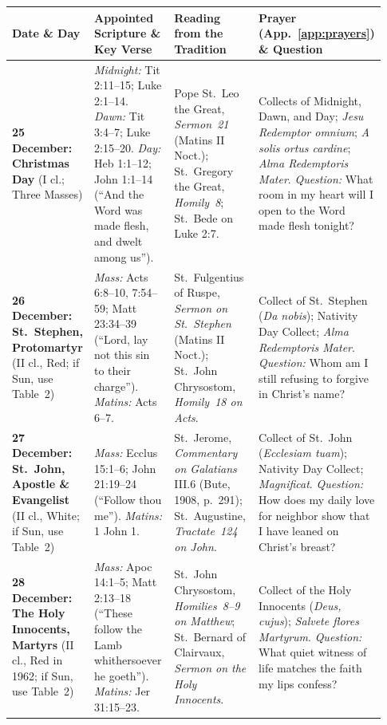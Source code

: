 {\footnotesize
\begin{longtable}{>{\raggedright\arraybackslash}p{0.15\linewidth}>{\raggedright\arraybackslash}p{0.25\linewidth}>{\raggedright\arraybackslash}p{0.27\linewidth}>{\raggedright\arraybackslash}p{0.26\linewidth}}
\toprule
\textbf{Date \& Day} & \textbf{Appointed Scripture \& Key Verse} & \textbf{Reading from the Tradition} & \textbf{Prayer (App.~\ref{app:prayers}) \& Question}\\
\midrule
\endhead
\textbf{25 December: Christmas Day} (I cl.; Three Masses) & \textit{Midnight:} Tit 2:11--15; Luke 2:1--14. \textit{Dawn:} Tit 3:4--7; Luke 2:15--20. \textit{Day:} Heb 1:1--12; John 1:1--14 (``And the Word was made flesh, and dwelt among us''). & Pope St.~Leo the Great, \textit{Sermon~21} (Matins II Noct.); St.~Gregory the Great, \textit{Homily~8}; St.~Bede on Luke 2:7. & Collects of Midnight, Dawn, and Day; \textit{Jesu Redemptor omnium}; \textit{A solis ortus cardine}; \textit{Alma Redemptoris Mater}. \textit{Question:} What room in my heart will I open to the Word made flesh tonight?\\
\textbf{26 December: St.~Stephen, Protomartyr} (II cl., Red; if Sun, use Table~2) & \textit{Mass:} Acts 6:8--10, 7:54--59; Matt 23:34--39 (``Lord, lay not this sin to their charge''). \textit{Matins:} Acts 6--7. & St.~Fulgentius of Ruspe, \textit{Sermon on St.~Stephen} (Matins II Noct.); St.~John Chrysostom, \textit{Homily~18 on Acts}. & Collect of St.~Stephen (\textit{Da nobis}); Nativity Day Collect; \textit{Alma Redemptoris Mater}. \textit{Question:} Whom am I still refusing to forgive in Christ's name?\\
\textbf{27 December: St.~John, Apostle \& Evangelist} (II cl., White; if Sun, use Table~2) & \textit{Mass:} Ecclus 15:1--6; John 21:19--24 (``Follow thou me''). \textit{Matins:} 1 John 1. & St.~Jerome, \textit{Commentary on Galatians} III.6 (Bute, 1908, p.~291); St.~Augustine, \textit{Tractate~124 on John}. & Collect of St.~John (\textit{Ecclesiam tuam}); Nativity Day Collect; \textit{Magnificat}. \textit{Question:} How does my daily love for neighbor show that I have leaned on Christ's breast?\\
\textbf{28 December: The Holy Innocents, Martyrs} (II cl., Red in 1962; if Sun, use Table~2) & \textit{Mass:} Apoc 14:1--5; Matt 2:13--18 (``These follow the Lamb whithersoever he goeth''). \textit{Matins:} Jer 31:15--23. & St.~John Chrysostom, \textit{Homilies~8--9 on Matthew}; St.~Bernard of Clairvaux, \textit{Sermon on the Holy Innocents}. & Collect of the Holy Innocents (\textit{Deus, cujus}); \textit{Salvete flores Martyrum}. \textit{Question:} What quiet witness of life matches the faith my lips confess?\\

\end{longtable}}
